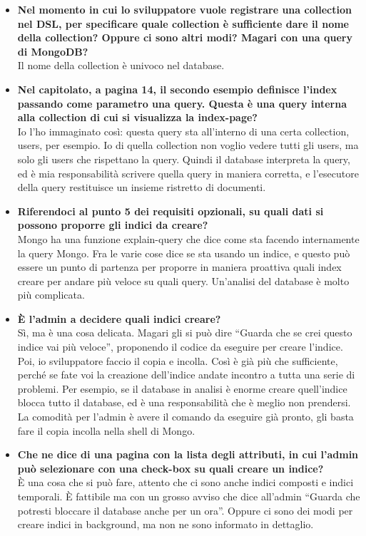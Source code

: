 \begin{itemize}
		\item
		{\bfseries Nel momento in cui lo sviluppatore vuole registrare una collection nel DSL, per specificare quale collection è sufficiente dare il nome della collection? Oppure ci sono altri modi? Magari con una query di MongoDB?} \\
		Il nome della collection è univoco nel database.
		
		\item
		{\bfseries Nel capitolato, a pagina 14, il secondo esempio definisce l'index passando come parametro una query. Questa è una query interna alla collection di cui si visualizza la index-page?} \\
		Io l'ho immaginato così: questa query sta all'interno di una certa collection, users, per esempio. Io di quella collection non voglio vedere tutti gli users, ma solo gli users che rispettano la query. Quindi il database interpreta la query, ed  è mia responsabilità scrivere quella query in maniera corretta, e l'esecutore della query restituisce un insieme ristretto di documenti.
		
		\item
		{\bfseries Riferendoci al punto 5 dei requisiti opzionali, su quali dati si possono proporre gli indici da creare?} \\
		Mongo ha una funzione explain-query che dice come sta facendo internamente la query Mongo. Fra le varie cose dice se sta usando un indice, e questo può essere un punto di partenza per proporre in maniera proattiva quali index creare per andare più veloce su quali query. Un'analisi del database è molto più complicata.
		
		\item
		{\bfseries È l'admin a decidere quali indici creare?} \\
		Sì, ma è una cosa delicata. Magari gli si può dire ``Guarda che se crei questo indice vai più veloce'', proponendo il codice da eseguire per creare l'indice. Poi, io sviluppatore faccio il copia e incolla. Così è già più che sufficiente, perché se fate voi la creazione dell'indice andate incontro a tutta una serie di problemi. Per esempio, se il database in analisi è enorme creare quell'indice blocca tutto il database, ed è una responsabilità che è meglio non prendersi. La comodità per l'admin è avere il comando da eseguire già pronto, gli basta fare il copia incolla nella shell di Mongo.
		
		\item
		{\bfseries Che ne dice di una pagina con la lista degli attributi, in cui l'admin può selezionare con una check-box su quali creare un indice?} \\
		È una cosa che si può fare, attento che ci sono anche indici composti e indici temporali. È fattibile ma con un grosso avviso che dice all'admin ``Guarda che potresti bloccare il database anche per un ora''. Oppure ci sono dei modi per creare indici in background, ma non ne sono informato in dettaglio.
		

\end{itemize}
